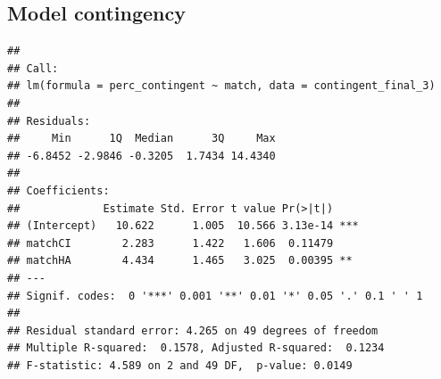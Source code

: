 \documentclass[
]{article}
\newenvironment{Shaded}{\begin{snugshade}}{\end{snugshade}}
\newcommand{\AttributeTok}[1]{\textcolor[rgb]{0.77,0.63,0.00}{#1}}
\newcommand{\CommentTok}[1]{\textcolor[rgb]{0.56,0.35,0.01}{\textit{#1}}}
\newcommand{\FunctionTok}[1]{\textcolor[rgb]{0.00,0.00,0.00}{#1}}
\newcommand{\NormalTok}[1]{#1}
\newcommand{\OtherTok}[1]{\textcolor[rgb]{0.56,0.35,0.01}{#1}}
\newcommand{\SpecialCharTok}[1]{\textcolor[rgb]{0.00,0.00,0.00}{#1}}
\newcommand{\StringTok}[1]{\textcolor[rgb]{0.31,0.60,0.02}{#1}}
\begin{document}
\hypertarget{model-contingency}{%
\subsection{Model contingency}\label{model-contingency}}

\begin{Shaded}
\end{Shaded}

\begin{verbatim}
## 
## Call:
## lm(formula = perc_contingent ~ match, data = contingent_final_3)
## 
## Residuals:
##     Min      1Q  Median      3Q     Max 
## -6.8452 -2.9846 -0.3205  1.7434 14.4340 
## 
## Coefficients:
##             Estimate Std. Error t value Pr(>|t|)    
## (Intercept)   10.622      1.005  10.566 3.13e-14 ***
## matchCI        2.283      1.422   1.606  0.11479    
## matchHA        4.434      1.465   3.025  0.00395 ** 
## ---
## Signif. codes:  0 '***' 0.001 '**' 0.01 '*' 0.05 '.' 0.1 ' ' 1
## 
## Residual standard error: 4.265 on 49 degrees of freedom
## Multiple R-squared:  0.1578, Adjusted R-squared:  0.1234 
## F-statistic: 4.589 on 2 and 49 DF,  p-value: 0.0149
\end{verbatim}
\end{document}
